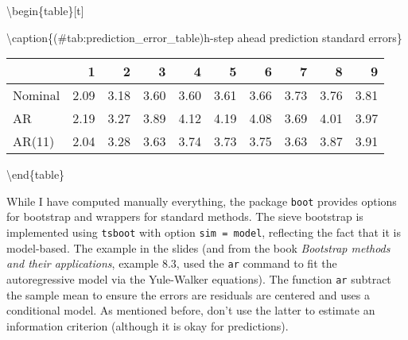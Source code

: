 \documentclass[]{book}
\newenvironment{Shaded}{\begin{snugshade}}{\end{snugshade}}
\newcommand{\DataTypeTok}[1]{\textcolor[rgb]{0.13,0.29,0.53}{#1}}
\newcommand{\DecValTok}[1]{\textcolor[rgb]{0.00,0.00,0.81}{#1}}
\newcommand{\KeywordTok}[1]{\textcolor[rgb]{0.13,0.29,0.53}{\textbf{#1}}}
\newcommand{\NormalTok}[1]{#1}
\newcommand{\OperatorTok}[1]{\textcolor[rgb]{0.81,0.36,0.00}{\textbf{#1}}}
\newcommand{\StringTok}[1]{\textcolor[rgb]{0.31,0.60,0.02}{#1}}
\begin{document}
\begin{Shaded}
\end{Shaded}

\textbackslash{}begin\{table\}{[}t{]}

\textbackslash{}caption\{(\#tab:prediction\_error\_table)h-step ahead prediction standard errors\}
\centering

\begin{tabular}{l|r|r|r|r|r|r|r|r|r}
\hline
  & 1 & 2 & 3 & 4 & 5 & 6 & 7 & 8 & 9\\
\hline
Nominal & 2.09 & 3.18 & 3.60 & 3.60 & 3.61 & 3.66 & 3.73 & 3.76 & 3.81\\
\hline
AR & 2.19 & 3.27 & 3.89 & 4.12 & 4.19 & 4.08 & 3.69 & 4.01 & 3.97\\
\hline
AR(11) & 2.04 & 3.28 & 3.63 & 3.74 & 3.73 & 3.75 & 3.63 & 3.87 & 3.91\\
\hline
\end{tabular}

\textbackslash{}end\{table\}

While I have computed manually everything, the package \texttt{boot} provides options for bootstrap and wrappers for standard methods. The sieve bootstrap is implemented using \texttt{tsboot} with option \texttt{sim\ =\ model}, reflecting the fact that it is model-based. The example in the slides (and from the book \emph{Bootstrap methods and their applications}, example 8.3, used the \texttt{ar} command to fit the autoregressive model via the Yule-Walker equations). The function \texttt{ar} subtract the sample mean to ensure the errors are residuals are centered and uses a conditional model. As mentioned before, don't use the latter to estimate an information criterion (although it is okay for predictions).
\end{document}
